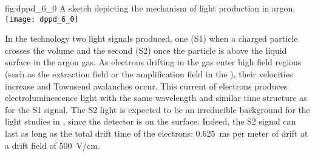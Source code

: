 \begin{dunefigure}{fig:dppd_6_0}
{A sketch depicting the mechanism of light production in argon.}
\texttt{[image: dppd\_6\_0]}
\end{dunefigure}

In the \dual technology two light signals produced, one (S1) when a charged particle crosses the \lar volume and the second (S2) once the particle is above the liquid surface in the argon gas. 
As electrons drifting in the gas enter high field regions (such as the extraction field or the amplification field in the ), their velocities increase and Townsend avalanches occur. This current of electrons produces electroluminescence light with the same wavelength and similar time structure as for the S1 signal. 
The S2 light is expected to be an irreducible background for the light studies in , since the detector is on the surface. Indeed, the S2 signal can last as long as the total drift time of the electrons: \SI{0.625}{ms} per meter of drift at a drift field of \SI{500}{V/cm}.

